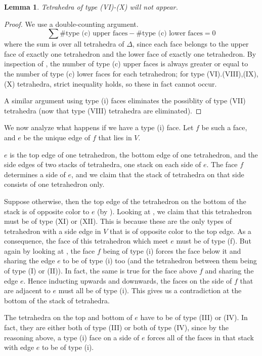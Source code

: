 \documentclass[12pt]{amsart}
\newtheorem{lemma}[thm]{Lemma}
\theoremstyle{definition}
\numberwithin{equation}{section}
\begin{document}
\begin{lemma} \label{lemma:tettypeelim}
Tetrahedra of type (VI)-(X) will not appear.
\end{lemma}

\begin{proof}
We use a double-counting argument. $$\sum \text{\# type (c) upper faces} - \text{\# type (c) lower faces} =0$$ where the sum is over all tetrahedra of $\Delta$, since each face belongs to the upper face of exactly one tetrahedron and the lower face of exactly one tetrahedron. By inspection of , the number of type (c) upper faces is always greater or equal to the number of type (c) lower faces for each tetrahedron; for type (VI).(VIII),(IX),(X) tetrahedra, strict inequality holds, so these in fact cannot occur. 

A similar argument using type (i) faces eliminates the possiblity of type (VII) tetrahedra (now that type (VIII) tetrahedra are eliminated).
\end{proof}

We now analyze what happens if we have a type (i) face. Let $f$ be such a face, and $e$ be the unique edge of $f$ that lies in $V$. 

$e$ is the top edge of one tetrahedron, the bottom edge of one tetrahedron, and the side edges of two stacks of tetrahedra, one stack on each side of $e$. The face $f$ determines a side of $e$, and we claim that the stack of tetrahedra on that side consists of one tetrahedron only. 

Suppose otherwise, then the top edge of the tetrahedron on the bottom of the stack is of opposite color to $e$ (by ). Looking at , we claim that this tetrahedron must be of type (XI) or (XII). This is because these are the only types of tetrahedron with a side edge in $V$ that is of opposite color to the top edge. As a consequence, the face of this tetrahedron which meet $e$ must be of type (f). But again by looking at , the face $f$ being of type (i) forces the face below it and sharing the edge $e$ to be of type (i) too (and the tetrahedron between them being of type (I) or (II)). In fact, the same is true for the face above $f$ and sharing the edge $e$. Hence inducting upwards and downwards, the faces on the side of $f$ that are adjacent to $e$ must all be of type (i). This gives us a contradiction at the bottom of the stack of tetrahedra.

The tetrahedra on the top and bottom of $e$ have to be of type (III) or (IV). In fact, they are either both of type (III) or both of type (IV), since by the reasoning above, a type (i) face on a side of $e$ forces all of the faces in that stack with edge $e$ to be of type (i).
\end{document}
